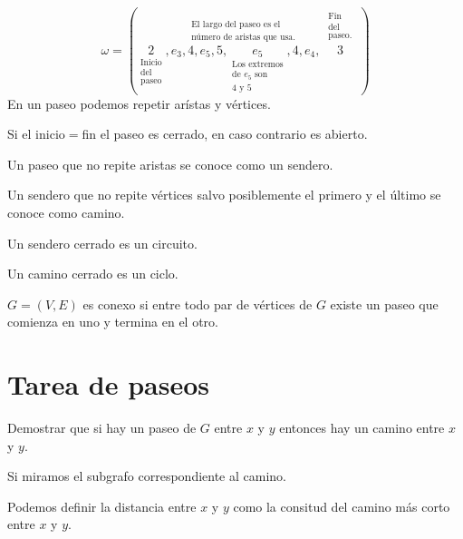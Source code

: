 \documentclass[../main.tex]{subfiles}
\begin{document}
\[
	\omega =
	(
		\underset
		{
			\substack
			{
				\text{Inicio}\\
				\text{del}\\
				\text{paseo}
			}
		}
		{
			2
		}
		,
		\overset
		{
			\substack
			{
				\text{El largo del paseo es el}\\
				\text{número de aristas que usa.}
			}
		}
		{
			e_3
			,
			4
			,
			e_5
			,
			5
			,
			\underset
			{
				\substack
				{
					\text{Los extremos}\\
					\text{de $e_5$ son}\\
					\text{4 y 5}
				}
			}
			{
				e_5
			}
			,
			4
			,
			e_4
		}
		,
		\overset
		{
			\substack
			{
				\substack
				{
					\text{Fin}\\
					\text{del}\\
					\text{paseo.}
				}
			}
		}
		{
			3
		}
	)
\]
En un paseo podemos repetir arístas y vértices.

Si el inicio$=$fin el paseo es cerrado, en caso contrario es abierto.


Un paseo que no repite aristas se conoce como un sendero.

Un sendero que no repite vértices salvo posiblemente el primero y el último se
conoce como camino.

Un sendero cerrado es un circuito.

Un camino cerrado es un ciclo.

$G=(V,E)$ es conexo si entre todo par de vértices de $G$ existe un paseo que
comienza en uno y termina en el otro.

\section{Tarea de paseos}%
\label{sec:tarea_de_paseos}

Demostrar que si hay un paseo de $G$ entre $x$ y $y$ entonces hay un camino
entre $x$ y $y$.

Si miramos el subgrafo correspondiente al camino.

Podemos definir la distancia entre $x$ y $y$ como la consitud del camino más
corto entre $x$ y $y$.
\end{document}
